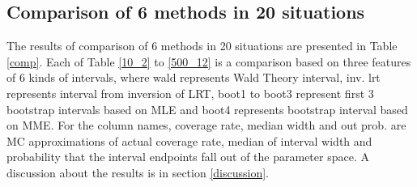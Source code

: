 \documentclass{article}
\begin{document}
    \subsection{Comparison of 6 methods in 20 situations}
    The results of comparison of 6 methods in 20 situations are presented in Table \ref{comp}. Each of Table \ref{10_2} to \ref{500_12} is a comparison based on three features of 6 kinds of intervals, where wald represents Wald Theory interval, inv. lrt represents interval from inversion of LRT, boot1 to boot3 represent first 3 bootstrap intervals based on MLE and boot4 represents bootstrap interval based on MME. For the column names, coverage rate, median width and out prob. are MC approximations of actual coverage rate, median of interval width and probability that the interval endpoints fall out of the parameter space.  A discussion about the results is in section \ref{discussion}.
\end{document}
